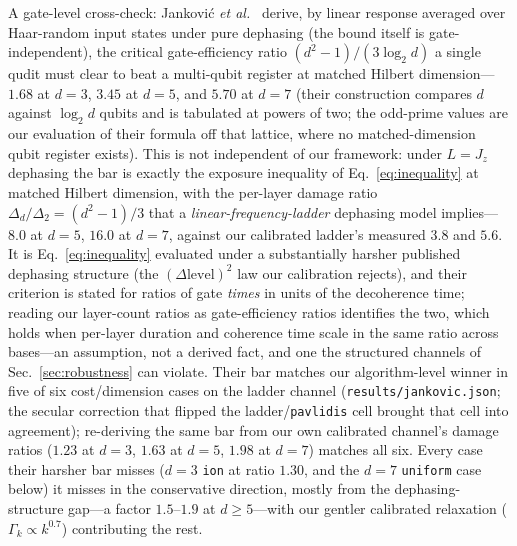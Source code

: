 \documentclass[aps,pra,reprint,superscriptaddress,nofootinbib,floatfix]{revtex4-2}
\begin{document}
A gate-level cross-check: Jankovi\'c \emph{et al.}~\cite{jankovic2024}
derive, by linear response averaged over Haar-random input states
under pure dephasing (the bound itself is gate-independent),
the critical gate-efficiency ratio $(d^2-1)/(3\log_2 d)$ a single
qudit must clear to beat a multi-qubit register at matched Hilbert
dimension---$1.68$ at $d=3$, $3.45$ at $d=5$, and $5.70$ at $d=7$
(their construction compares $d$ against $\log_2 d$ qubits and is
tabulated at powers of two; the odd-prime values are our evaluation
of their formula off that lattice, where no matched-dimension qubit
register exists).
This is not independent of our framework: under $L=J_z$ dephasing
the bar is exactly the exposure inequality of
Eq.~\eqref{eq:inequality} at matched Hilbert dimension, with the
per-layer damage ratio $\Delta_d/\Delta_2=(d^2-1)/3$ that a
\emph{linear-frequency-ladder} dephasing model implies---$8.0$ at
$d=5$, $16.0$ at $d=7$, against our calibrated ladder's measured
$3.8$ and $5.6$. It is Eq.~\eqref{eq:inequality} evaluated under a
substantially harsher published dephasing structure (the
$(\Delta\mathrm{level})^2$ law our calibration rejects), and their
criterion is stated for ratios of gate \emph{times} in units of
the decoherence time; reading our layer-count ratios as
gate-efficiency ratios identifies the two, which holds when per-layer
duration and coherence time scale in the same ratio across
bases---an assumption, not a derived fact, and one the structured
channels of Sec.~\ref{sec:robustness} can violate. Their bar
matches our algorithm-level winner in five of six cost/dimension
cases on the ladder channel (\texttt{results/jankovic.json}; the
secular correction that flipped the ladder/\texttt{pavlidis} cell
brought that cell into agreement);
re-deriving the same bar from our own calibrated channel's damage
ratios ($1.23$ at $d=3$, $1.63$ at $d=5$, $1.98$ at $d=7$) matches
all six. Every case their harsher bar misses ($d=3$ \texttt{ion}
at ratio $1.30$, and the $d=7$
\texttt{uniform} case below) it misses in the conservative
direction, mostly from the dephasing-structure gap---a factor
$1.5$--$1.9$ at $d\ge5$---with our gentler calibrated relaxation
($\Gamma_k\propto k^{0.7}$) contributing the rest.
\end{document}
